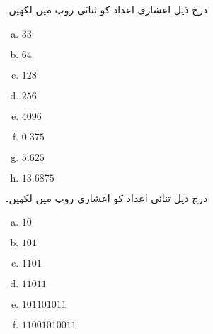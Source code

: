 درج ذیل اعشاری اعداد کو ثنائی روپ میں لکھیں۔
\begin{multicols}{4}
\begin{enumerate}[a.]

\item

 \(33\)

\item

 \(64\)

\item

 \(128\) 

\item

 \(256\)

\item

 \(4096\)

\item

 \(0.375\)

\item

 \(5.625\) 

\item

 \(13.6875\)
\end{enumerate}
\end{multicols}
درج ذیل ثنائی اعداد کو اعشاری روپ میں لکھیں۔
\begin{multicols}{4}
\begin{enumerate}[a.]

\item  
 
 \(10\)  

\item  
 
 \(101\) 

\item  
 
 \(1101\)  

\item  
 
 \(11011\)

\item  
 
 \(101101011\) 

\item  
 
 \(11001010011\)  
\end{enumerate}
\end{multicols}
